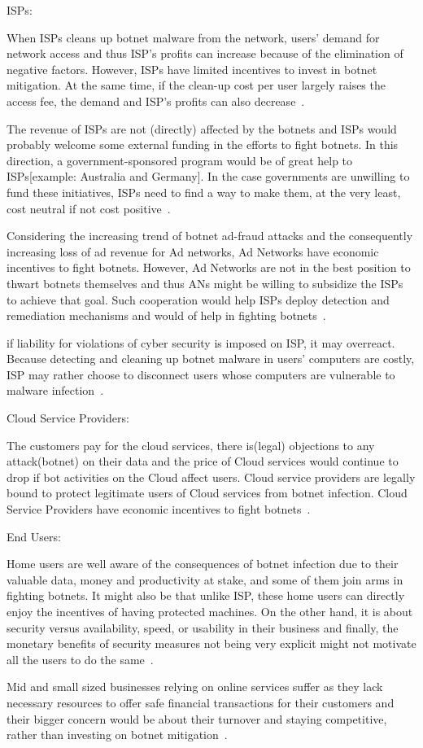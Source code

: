 ISPs:

When ISPs cleans up botnet malware from the network, users’ demand for network access and thus ISP’s profits can increase because of the elimination of negative factors. However, ISPs have limited incentives to invest in botnet mitigation. At the same time, if the clean-up cost per user largely raises the access fee, the demand and ISP’s profits can also decrease~\cite{asghari2010botnet}. 

The revenue of ISPs are not (directly) affected by the botnets and ISPs would probably welcome some external funding in the efforts to fight botnets. In this direction, a government-sponsored program would be of great help to ISPs[example: Australia and Germany]. In the case governments are unwilling to fund these initiatives, ISPs need to find a way to make them, at the very least, cost neutral if not cost positive~\cite{asghari2010botnet}. 

Considering the increasing trend of botnet ad-fraud attacks and the consequently increasing loss of ad revenue for Ad networks, Ad Networks have economic incentives to fight botnets. However, Ad Networks are not in the best position to thwart botnets themselves and thus ANs might be willing to subsidize the ISPs to achieve that goal. Such cooperation would help ISPs deploy detection and remediation mechanisms and would of help in fighting botnets~\cite{vratonjic2010isps}. 

if liability for violations of cyber security is imposed on ISP, it may overreact. Because detecting and cleaning up botnet malware in users’ computers are costly, ISP may rather choose to disconnect users whose computers are vulnerable to malware infection~\cite{kinukawa2012should}.

Cloud Service Providers:

The customers pay for the cloud services, there is(legal) objections to any attack(botnet) on their data and the price of Cloud services would continue to drop if bot activities on the Cloud affect users. Cloud service providers are legally  bound to protect legitimate users of Cloud services from botnet infection. Cloud Service Providers have economic incentives to fight botnets~\cite{peng2014moving}.

End Users:

Home users are well aware of the consequences of botnet infection due to their valuable data, money and productivity at stake, and some of them join arms in fighting botnets. It might also be that unlike ISP, these home users can directly enjoy the incentives of having protected machines. On the other hand, it is about security versus availability, speed, or usability in their business and finally, the monetary benefits of security measures not being very explicit might not motivate all the users to do the same~\cite{asghari2010botnet}.

Mid and small sized businesses relying on online services suffer as they lack necessary resources to offer safe financial transactions for their customers and their bigger concern would be about their turnover and staying competitive, rather than investing on botnet mitigation~\cite{asghari2010botnet}.

